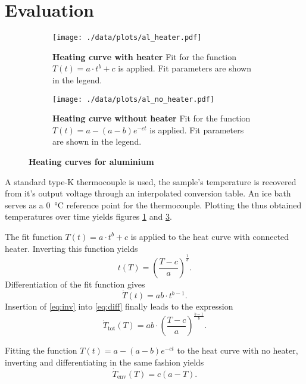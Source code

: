 \section{Evaluation}
\begin{figure}[tbp]
	\centering
	\begin{subfigure}{.45\textwidth}
		\centering
		\texttt{[image: ./data/plots/al\_heater.pdf]}
		\caption[Heating curve with heater]{\textbf{Heating curve with heater} Fit for the function $T(t)=a\cdot t^b + c$ is applied. Fit parameters are shown in the legend.}
		\label{fig:heater}
	\end{subfigure}
	\quad
	\begin{subfigure}{.45\textwidth}
		\centering
		\texttt{[image: ./data/plots/al\_no\_heater.pdf]}
		\caption[Heating curve without heater]{\textbf{Heating curve without heater} Fit for the function $T(t)=a - (a-b)e^{-ct}$ is applied. Fit parameters are shown in the legend.}
		\label{fig:no_heater}
	\end{subfigure}
	\caption[Heating curves for aluminium]{\textbf{Heating curves for aluminium}}
\end{figure}

A standard type-K thermocouple is used, the sample's temperature is recovered from it's output voltage through an interpolated conversion table.
An ice bath serves as a \SI{0}{\celsius} reference point for the thermocouple.
Plotting the thus obtained temperatures over time yields figures \ref{fig:heater} and \ref{fig:no_heater}.

The fit function $T(t)=a\cdot t^b + c$ is applied to the heat curve with connected heater.	%
Inverting this function yields
\begin{equation}\label{eq:inv}
	t(T) = \left(\frac{T-c}{a}\right)^\frac{1}{b}.
\end{equation}
Differentiation of the fit function gives
\begin{equation}\label{eq:diff}
	\dot{T}(t) = ab\cdot t^{b-1}.
\end{equation}
Insertion of \autoref{eq:inv} into \autoref{eq:diff} finally leads to the expression
\begin{equation*}
	\dot{T}_\text{tot}(T) = ab\cdot\left(\frac{T-c}{a}\right)^{\frac{b-1}{b}}.
\end{equation*}

Fitting the function $T(t)=a - (a-b)e^{-ct}$ to the heat curve with no heater, inverting and differentiating in the same fashion yields
\begin{equation*}
	\dot{T}_\text{env}(T) = c(a-T).
\end{equation*}

